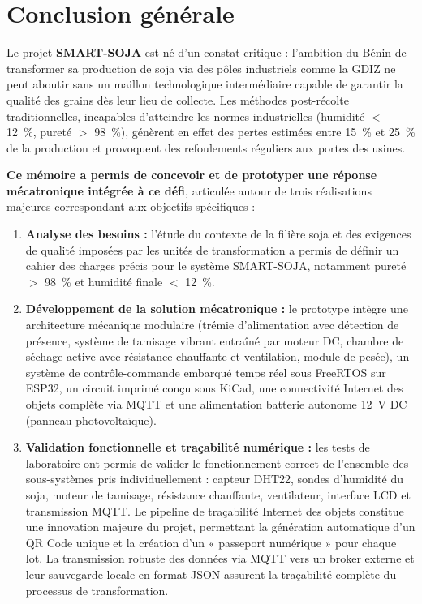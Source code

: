 \chapter*{Conclusion générale}

Le projet \textbf{SMART-SOJA} est né d'un constat critique : l'ambition du Bénin de transformer sa production de soja via des pôles industriels comme la GDIZ ne peut aboutir sans un maillon technologique intermédiaire capable de garantir la qualité des grains dès leur lieu de collecte. Les méthodes post-récolte traditionnelles, incapables d'atteindre les normes industrielles (humidité $<$ 12~\%, pureté $>$ 98~\%), génèrent en effet des pertes estimées entre 15~\% et 25~\% de la production et provoquent des refoulements réguliers aux portes des usines.

\textbf{Ce mémoire a permis de concevoir et de prototyper une réponse mécatronique intégrée à ce défi}, articulée autour de trois réalisations majeures correspondant aux objectifs spécifiques :

\begin{enumerate}
    \item \textbf{Analyse des besoins :} l'étude du contexte de la filière soja et des exigences de qualité imposées par les unités de transformation a permis de définir un cahier des charges précis pour le système SMART-SOJA, notamment pureté $>$ 98~\% et humidité finale $<$ 12~\%.

    \item \textbf{Développement de la solution mécatronique :} le prototype intègre une architecture mécanique modulaire (trémie d'alimentation avec détection de présence, système de tamisage vibrant entraîné par moteur DC, chambre de séchage active avec résistance chauffante et ventilation, module de pesée), un système de contrôle-commande embarqué temps réel sous FreeRTOS sur ESP32, un circuit imprimé conçu sous KiCad, une connectivité Internet des objets complète via MQTT et une alimentation batterie autonome 12~V DC (panneau photovoltaïque).

    \item \textbf{Validation fonctionnelle et traçabilité numérique :} les tests de laboratoire ont permis de valider le fonctionnement correct de l'ensemble des sous-systèmes pris individuellement : capteur DHT22, sondes d'humidité du soja, moteur de tamisage, résistance chauffante, ventilateur, interface LCD et transmission MQTT. Le pipeline de traçabilité Internet des objets constitue une innovation majeure du projet, permettant la génération automatique d'un QR Code unique et la création d'un « passeport numérique » pour chaque lot. La transmission robuste des données via MQTT vers un broker externe et leur sauvegarde locale en format JSON assurent la traçabilité complète du processus de transformation.
\end{enumerate}


